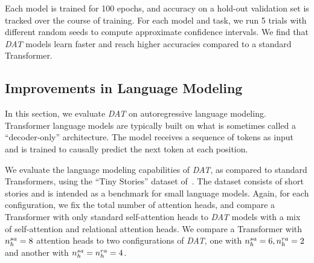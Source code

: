 Each model is trained for 100 epochs, and accuracy on a hold-out validation set is tracked over the course of training. For each model and task, we run 5 trials with different random seeds to compute approximate confidence intervals. We find that \textit{DAT} models learn faster and reach higher accuracies compared to a standard Transformer.

\subsection{Improvements in Language Modeling}\label{ssec:tiny_stories}

In this section, we evaluate \textit{DAT} on autoregressive language modeling. Transformer language models are typically built on what is sometimes called a ``decoder-only'' architecture. The model receives a sequence of tokens as input and is trained to causally predict the next token at each position.

We evaluate the language modeling capabilities of \textit{DAT}, as compared to standard Transformers, using the ``Tiny Stories'' dataset of~\citet{eldanTinyStoriesHowSmall2023}. The dataset consists of short stories and is intended as a benchmark for small language models. Again, for each configuration, we fix the total number of attention heads, and compare a Transformer with only standard self-attention heads to \textit{DAT} models with a mix of self-attention and relational attention heads. We compare a Transformer with $n_h^{sa} = 8$ attention heads to two configurations of \textit{DAT}, one with $n_h^{sa} = 6, n_h^{ra} = 2$ and another with $n_h^{sa} = n_h^{ra} = 4$.

